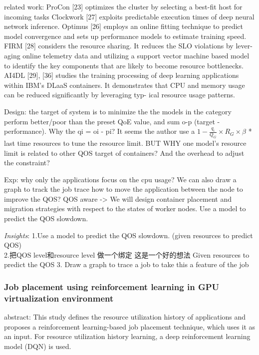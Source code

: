 \documentclass[UTF8]{article}
\begin{document}
    related work: ProCon [23] optimizes the cluster by selecting a best-fit host for incoming tasks Clockwork [27] exploits predictable execution times of deep neural network inference. Optimus [26] employs an online fitting technique to predict model convergence and sets up performance models to estimate training speed.  FIRM [28] considers the resource sharing. It reduces the SLO violations by lever- aging online telemetry data and utilizing a support vector machine based model to identify the key components that are likely to become resource bottlenecks. AI4DL [29], [36] studies the training processing of deep learning applications within IBM’s DLaaS containers. It demonstrates that CPU and memory usage can be reduced significantly by leveraging typ- ical resource usage patterns.
    
    Design: the target of system is to minimize the the models in the category perform better/poor than the preset QoE value, and sum o-p (target - performance).  Why the qi = oi - pi?  It seems the author use a $1− \frac{q_i}{Q_G}×R_G ×β$ * last time resources to tune the resource limit. BUT WHY one model's resource limit is related to other QOS target of containers? And the overhead to adjust the constraint? 
    
    Exp: why only the applications focus on the cpu usage? We can also draw a graph to track the job trace  how to move the application between the node to improve the QOS? QOS aware -> We will design container placement and migration strategies with respect to the states of worker nodes.  Use a model to predict the QOS slowdown.
    
    \emph{Insights}: 
    1.Use a model to predict the QOS slowdown. (given resources to predict QOS) \\
    2.把QOS level和resource level 做一个绑定 这是一个好的想法 Given resources to predict the QOS
    3. Draw a graph to trace a job to take this a feature of the job
    \subsubsection{Job placement using reinforcement learning in GPU virtualization environment}
    
    abstract: This study defines the resource utilization history of applications and proposes a reinforcement learning-based job placement technique, which uses it as an input. For resource utilization history learning, a deep reinforcement learning model (DQN) is used. 
    
\end{document}
